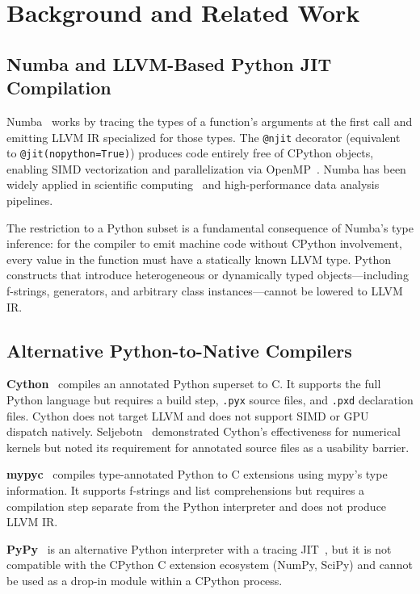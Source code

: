 \documentclass[journal]{IEEEtran}
\begin{document}
\section{Background and Related Work}

\subsection{Numba and LLVM-Based Python JIT Compilation}

Numba~\cite{lam2015numba} works by tracing the types of a function's arguments
at the first call and emitting LLVM IR specialized for those types. The
\texttt{@njit} decorator (equivalent to \texttt{@jit(nopython=True)}) produces
code entirely free of CPython objects, enabling SIMD vectorization and
parallelization via OpenMP~\cite{rauchwerger1999lrpd}. Numba has been widely applied in scientific
computing~\cite{oliphant2007python} and high-performance data analysis
pipelines.

The restriction to a Python subset is a fundamental consequence of Numba's
type inference: for the compiler to emit machine code without CPython
involvement, every value in the function must have a statically known LLVM
type. Python constructs that introduce heterogeneous or dynamically typed
objects—including f-strings, generators, and arbitrary class instances—cannot
be lowered to LLVM IR.

\subsection{Alternative Python-to-Native Compilers}

\textbf{Cython}~\cite{behnel2011cython} compiles an annotated Python superset
to C. It supports the full Python language but requires a build step,
\texttt{.pyx} source files, and \texttt{.pxd} declaration files. Cython does
not target LLVM and does not support SIMD or GPU dispatch natively.
Seljebotn~\cite{seljebotn2009fast} demonstrated Cython's effectiveness for
numerical kernels but noted its requirement for annotated source files as a
usability barrier.

\textbf{mypyc}~\cite{lehtosalo2022mypyc} compiles type-annotated Python to C
extensions using mypy's type information. It supports f-strings and list
comprehensions but requires a compilation step separate from the Python
interpreter and does not produce LLVM IR.

\textbf{PyPy}~\cite{rigo2006pypy} is an alternative Python interpreter with a
tracing JIT~\cite{bolz2009tracing}, but it is not compatible with the CPython
C extension ecosystem (NumPy, SciPy) and cannot be used as a drop-in module
within a CPython process.
\end{document}
